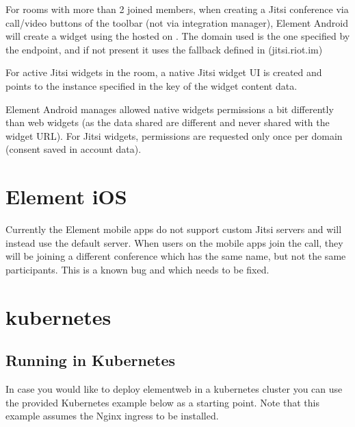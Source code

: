 \documentclass[letterpaper,10pt,openany,oneside,english]{sphinxmanual}
\begin{document}
\sphinxAtStartPar
For rooms with more than 2 joined members, when creating a Jitsi conference via call/video buttons of the toolbar (not via integration manager), Element Android will create a widget using the  hosted on .
The domain used is the one specified by the  endpoint, and if not present it uses the fallback defined in  (jitsi.riot.im)

\sphinxAtStartPar
For active Jitsi widgets in the room, a native Jitsi widget UI is created and points to the instance specified in the  key of the widget content data.

\sphinxAtStartPar
Element Android manages allowed native widgets permissions a bit differently than web widgets (as the data shared are different and never shared with the widget URL). For Jitsi widgets, permissions are requested only once per domain (consent saved in account data).


\chapter{Element iOS}
\label{\detokenize{jitsi:element-ios}}
\sphinxAtStartPar
Currently the Element mobile apps do not support custom Jitsi servers and will instead
use the default  server. When users on the mobile apps join the call,
they will be joining a different conference which has the same name, but not the same
participants. This is a known bug and which needs to be fixed.


\chapter{kubernetes}
\label{\detokenize{kubernetes:kubernetes}}\label{\detokenize{kubernetes::doc}}

\section{Running in Kubernetes}
\label{\detokenize{kubernetes:running-in-kubernetes}}
\sphinxAtStartPar
In case you would like to deploy element\sphinxhyphen{}web in a kubernetes cluster you can use
the provided Kubernetes example below as a starting point. Note that this example assumes the
Nginx ingress to be installed.
\end{document}
